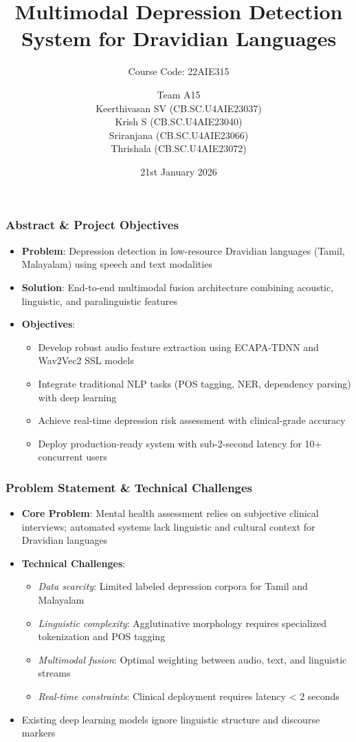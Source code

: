 \documentclass{beamer}
\title[Depression Detection from Speech]{Multimodal Depression Detection System for Dravidian Languages}
\subtitle{Course Code: 22AIE315}
\author{
Team A15\\[0.4em]
Keerthivasan SV (CB.SC.U4AIE23037)\\
Krish S (CB.SC.U4AIE23040)\\
Sriranjana (CB.SC.U4AIE23066)\\
Thrishala (CB.SC.U4AIE23072)
}
\date{21st January 2026}
\begin{document}
\begin{frame}
\titlepage
\end{frame}

\begin{frame}
\frametitle{Abstract \& Project Objectives}
\begin{itemize}
    \item \textbf{Problem}: Depression detection in low-resource Dravidian languages (Tamil, Malayalam) using speech and text modalities
    \item \textbf{Solution}: End-to-end multimodal fusion architecture combining acoustic, linguistic, and paralinguistic features
    \item \textbf{Objectives}:
    \begin{itemize}
        \item Develop robust audio feature extraction using ECAPA-TDNN and Wav2Vec2 SSL models
        \item Integrate traditional NLP tasks (POS tagging, NER, dependency parsing) with deep learning
        \item Achieve real-time depression risk assessment with clinical-grade accuracy
        \item Deploy production-ready system with sub-2-second latency for 10+ concurrent users
    \end{itemize}
    
\end{itemize}
\end{frame}

\begin{frame}
\frametitle{Problem Statement \& Technical Challenges}
\begin{itemize}
    \item \textbf{Core Problem}: Mental health assessment relies on subjective clinical interviews; automated systems lack linguistic and cultural context for Dravidian languages
    \item \textbf{Technical Challenges}:
    \begin{itemize}
        \item \textit{Data scarcity}: Limited labeled depression corpora for Tamil and Malayalam
        
        \item \textit{Linguistic complexity}: Agglutinative morphology requires specialized tokenization and POS tagging
        \item \textit{Multimodal fusion}: Optimal weighting between audio, text, and linguistic streams
        \item \textit{Real-time constraints}: Clinical deployment requires latency < 2 seconds
    \end{itemize}
   
    \item Existing deep learning models ignore linguistic structure and discourse markers
\end{itemize}
\end{frame}
\end{document}
